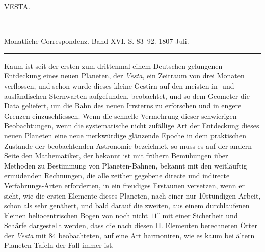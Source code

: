 \clearpage
{}
\hypertarget{native-293-lower}{}
\begin{center}
VESTA.
\end{center}

\begin{center}
\rule{0.6\linewidth}{0.4pt}\\
Monatliche Correspondenz. Band XVI. S. 83–92. 1807 Juli.\\
\rule{0.6\linewidth}{0.4pt}
\end{center}

\par\indent Kaum ist seit der ersten zum drittenmal einem Deutschen gelungenen Entdeckung eines neuen Planeten, der \emph{Vesta}, ein Zeitraum von drei Monaten verflossen, und schon wurde dieses kleine Gestirn auf den meisten in- und ausländischen Sternwarten aufgefunden, beobachtet, und so dem Geometer die Data geliefert, um die Bahn des neuen Irrsterns zu erforschen und in engere Grenzen einzuschliessen. Wenn die schnelle Vermehrung dieser schwierigen Beobachtungen, wenn die systematische nicht zufällige Art der Entdeckung dieses neuen Planeten eine neue merkwürdige glänzende Epoche in dem praktischen Zustande der beobachtenden Astronomie bezeichnet, so muss es auf der andern Seite den Mathematiker, der bekannt ist mit frühern Bemühungen über Methoden zu Bestimmung von Planeten-Bahnen, bekannt mit den weitläuftig ermüdenden Rechnungen, die alle zeither gegebene directe und indirecte Verfahrungs-Arten erforderten, in ein freudiges Erstaunen versetzen, wenn er sieht, wie die ersten Elemente dieses Planeten, nach einer nur 10stündigen Arbeit, schon als sehr genähert, und bald darauf die zweiten, aus einem durchlaufenen kleinen heliocentrischen Bogen von noch nicht $11^\circ$ mit einer Sicherheit und Schärfe dargestellt werden, dass die nach diesen II. Elementen berechneten Örter der \emph{Vesta} mit 84 beobachteten, auf eine Art harmoniren, wie es kaum bei ältern Planeten-Tafeln der Fall immer ist.

